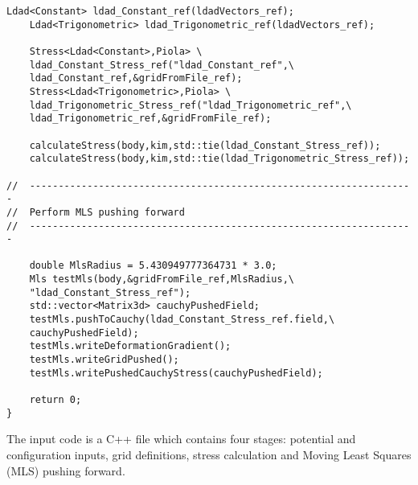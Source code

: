 \documentclass[authoryear]{elsarticle}
\begin{document}
\begin{Verbatim}[frame=single]
	Ldad<Constant> ldad_Constant_ref(ldadVectors_ref);
	Ldad<Trigonometric> ldad_Trigonometric_ref(ldadVectors_ref);

	Stress<Ldad<Constant>,Piola> \
	ldad_Constant_Stress_ref("ldad_Constant_ref",\
	ldad_Constant_ref,&gridFromFile_ref);
	Stress<Ldad<Trigonometric>,Piola> \
	ldad_Trigonometric_Stress_ref("ldad_Trigonometric_ref",\
	ldad_Trigonometric_ref,&gridFromFile_ref);

	calculateStress(body,kim,std::tie(ldad_Constant_Stress_ref));
	calculateStress(body,kim,std::tie(ldad_Trigonometric_Stress_ref));

//	-------------------------------------------------------------------
//	Perform MLS pushing forward
//	-------------------------------------------------------------------

	double MlsRadius = 5.430949777364731 * 3.0;
	Mls testMls(body,&gridFromFile_ref,MlsRadius,\
	"ldad_Constant_Stress_ref");
	std::vector<Matrix3d> cauchyPushedField;
	testMls.pushToCauchy(ldad_Constant_Stress_ref.field,\
	cauchyPushedField);
	testMls.writeDeformationGradient();
	testMls.writeGridPushed();
	testMls.writePushedCauchyStress(cauchyPushedField);

	return 0;
}
\end{Verbatim}
The input code is a C++ file which contains four stages: potential and configuration inputs, grid definitions,
stress calculation and Moving Least Squares (MLS) pushing forward.
\end{document}
